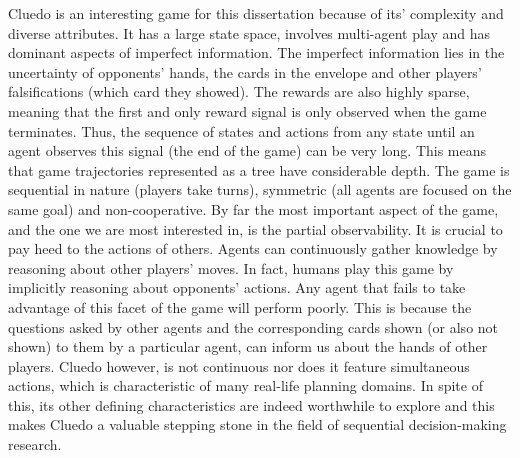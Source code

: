 \documentclass[msc, ai, twoside, notimes, logo, parskip, leftchapter, normalheadings]{infthesis}
\begin{document}
Cluedo is an interesting game for this dissertation because of its' complexity and diverse attributes. It has a large state space, involves multi-agent play and has dominant aspects of imperfect information. The imperfect information lies in the uncertainty of opponents' hands, the cards in the envelope and other players' falsifications (which card they showed). The rewards are also highly sparse, meaning that the first and only reward signal is only observed when the game terminates. Thus, the sequence of states and actions from any state until an agent observes this signal (the end of the game) can be very long. This means that game trajectories represented as a tree have considerable depth. The game is sequential in nature (players take turns), symmetric (all agents are focused on the same goal) and non-cooperative. By far the most important aspect of the game, and the one we are most interested in, is the partial observability. It is crucial to pay heed to the actions of others. Agents can continuously gather knowledge by reasoning about other players' moves. In fact, humans play this game by implicitly reasoning about opponents' actions. Any agent that fails to take advantage of this facet of the game will perform poorly. This is because the questions asked by other agents and the corresponding cards shown (or also not shown) to them by a particular agent, can inform us about the hands of other players. Cluedo however, is not continuous nor does it feature simultaneous actions, which is characteristic of many real-life planning domains. In spite of this, its other defining characteristics are indeed worthwhile to explore and this makes Cluedo a valuable stepping stone in the field of sequential decision-making research.
\end{document}
